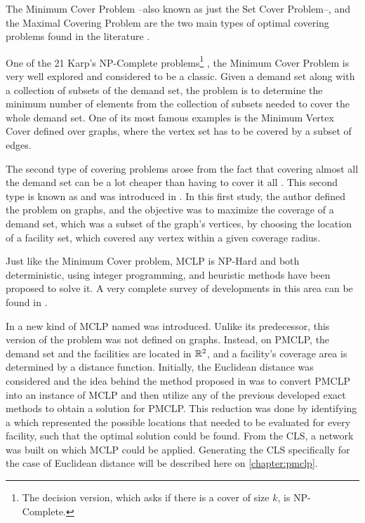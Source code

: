 The Minimum Cover Problem --also known as just the Set Cover Problem--, and the Maximal Covering Problem are the two main types of optimal covering problems found in the literature \cite{karatas}. 

One of the 21 Karp's NP-Complete problems\footnote{The decision version, which asks if there is a cover of size $k$, is NP-Complete.} \cite{karp}, the Minimum Cover Problem is very well explored and considered to be a classic. 
Given a demand set along with a collection of subsets of the demand set, the problem is to determine the minimum number of elements from the collection of subsets needed to cover the whole demand set. One of its most famous examples is the Minimum Vertex Cover defined over graphs, where the vertex set has to be covered by a subset of edges.

The second type of covering problems arose from the fact that covering almost all the demand set can be a lot cheaper than having to cover it all \cite{garcia}. This second type is known as  and was introduced in .
In this first study, the author defined the problem on graphs, and the objective was to maximize the coverage of a demand set, which was a subset of the graph's vertices, by choosing the location of a facility set, which covered any vertex within a given coverage radius.

Just like the Minimum Cover problem, MCLP is NP-Hard \cite{hatta:2013} and both deterministic, using integer programming, and heuristic methods have been proposed to solve it. A very complete survey of developments in this area can be found in .

In  a new kind of MCLP named  was introduced. Unlike its predecessor, this version of the problem was not defined on graphs. Instead, on PMCLP, the demand set and the facilities are located in $\mathbb{R}^2$, and a facility's coverage area is determined by a distance function.
Initially, the Euclidean distance was considered and the idea behind the method proposed in  was to convert PMCLP into an instance of MCLP and then utilize any of the previous developed exact methods to obtain a solution for PMCLP. This reduction was done by identifying a  which represented the possible locations that needed to be evaluated for every facility, such that the optimal solution could be found. From the CLS, a network was built on which MCLP could be applied. Generating the CLS specifically for the case of Euclidean distance will be described here on \autoref{chapter:pmclp}.

